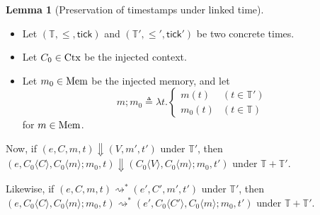 \documentclass{article}
\theoremstyle{definition}
\newtheorem{lem}{Lemma}[section]
\newcommand*{\Time}{\mathbb{T}}
\newcommand*{\Ctx}[1]{\text{Ctx}\vphantom{#1}}
\newcommand*{\Mem}[1]{\text{Mem}\vphantom{#1}}
\newcommand*{\mem}{m}
\newcommand*{\tick}{\mathsf{tick}}
\newcommand*{\inject}[2]{{#1}\langle{#2}\rangle}
\begin{document}
\begin{lem}[Preservation of timestamps under linked time]
  $\:$

  \begin{itemize}
    \item Let $(\Time,\le,\tick)$ and $(\Time',\le',\tick')$ be two concrete times.
    \item Let $C_{0}\in\Ctx{\Time}$ be the injected context.
    \item Let $\mem_{0}\in\Mem{\Time}$ be the injected memory, and let
          \[
            \mem;\mem_{0}\triangleq\lambda t.
            \begin{cases}
              \mem(t)     & (t\in\Time') \\
              \mem_{0}(t) & (t\in\Time)
            \end{cases}
          \]
          for $\mem\in\Mem{\Time'}$.
  \end{itemize}

  Now, if $(e,C,\mem,t)\Downarrow(V,\mem',t')$ under $\Time'$, then
  $(e,\inject{C_0}{C},\inject{C_0}{\mem};\mem_{0},t)\Downarrow(\inject{C_0}{V},\inject{C_0}{\mem};\mem_0,t')$ under $\Time+\Time'$.

  Likewise, if $(e,C,\mem,t)\rightsquigarrow^{*}(e',C',\mem',t')$ under $\Time'$, then
  $(e,\inject{C_0}{C},\inject{C_0}{\mem};\mem_{0},t)\rightsquigarrow^{*}(e',\inject{C_0}{C'},\inject{C_0}{\mem};\mem_0,t')$ under $\Time+\Time'$.
\end{lem}

\printbibliography
\end{document}
